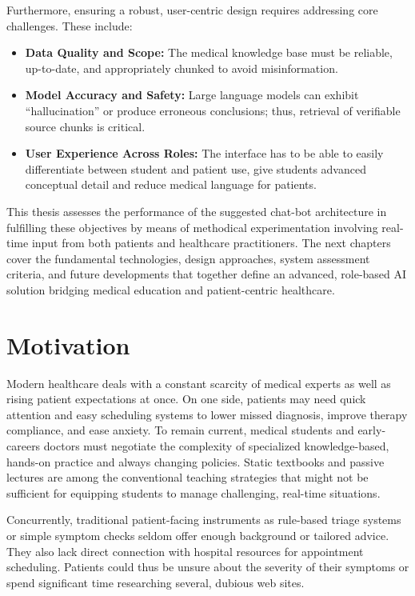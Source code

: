 \noindent Furthermore, ensuring a robust, user-centric design requires addressing core challenges. These include:
\begin{itemize}[itemsep=2em]
    \item \textbf{Data Quality and Scope:} The medical knowledge base must be reliable, up-to-date, and appropriately chunked to avoid misinformation.
    \item \textbf{Model Accuracy and Safety:} Large language models can exhibit “hallucination” or produce erroneous conclusions; thus, retrieval of verifiable source chunks is critical.
    \item \textbf{User Experience Across Roles:} The interface has to be able to easily differentiate between student and patient use, give students advanced conceptual detail and reduce medical language for patients.
\end{itemize}

\noindent This thesis assesses the performance of the suggested chat-bot architecture in fulfilling these objectives by means of methodical experimentation involving real-time input from both patients and healthcare practitioners. The next chapters cover the fundamental technologies, design approaches, system assessment criteria, and future developments that together define an advanced, role-based AI solution bridging medical education and patient-centric healthcare.


\section{Motivation}
\label{sec:motivation}

Modern healthcare deals with a constant scarcity of medical experts as well as rising patient expectations at once.  On one side, patients may need quick attention and easy scheduling systems to lower missed diagnosis, improve therapy compliance, and ease anxiety.  To remain current, medical students and early-careers doctors must negotiate the complexity of specialized knowledge-based, hands-on practice and always changing policies.  Static textbooks and passive lectures are among the conventional teaching strategies that might not be sufficient for equipping students to manage challenging, real-time situations.


\noindent Concurrently, traditional patient-facing instruments as rule-based triage systems or simple symptom checks seldom offer enough background or tailored advice.  They also lack direct connection with hospital resources for appointment scheduling.  Patients could thus be unsure about the severity of their symptoms or spend significant time researching several, dubious web sites.


